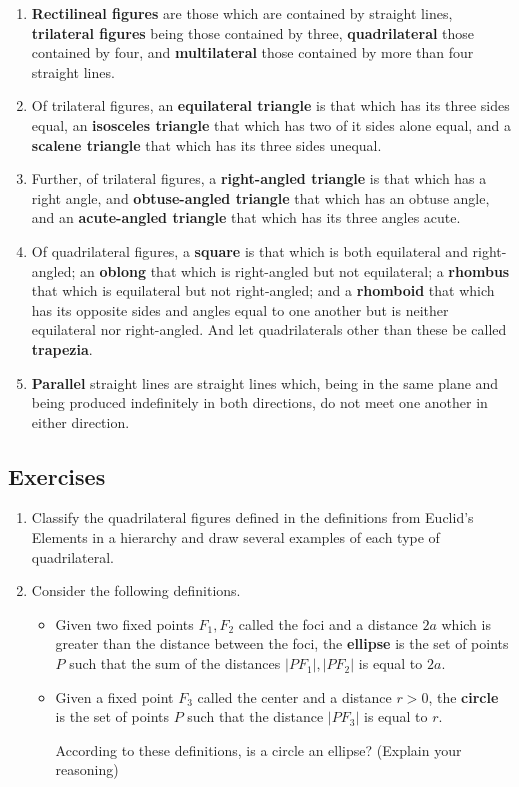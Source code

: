 \documentclass[
]{book}
\theoremstyle{definition}
\theoremstyle{definition}
\theoremstyle{definition}
\theoremstyle{definition}
\theoremstyle{remark}
\begin{document}
\begin{enumerate}
\item
  \textbf{Rectilineal figures} are those which are contained by straight lines, \textbf{trilateral figures} being those contained by three, \textbf{quadrilateral} those contained by four, and \textbf{multilateral} those contained by more than four straight lines.
\item
  Of trilateral figures, an \textbf{equilateral triangle} is that which has its three sides equal, an \textbf{isosceles triangle} that which has two of it sides alone equal, and a \textbf{scalene triangle} that which has its three sides unequal.
\item
  Further, of trilateral figures, a \textbf{right-angled triangle} is that which has a right angle, and \textbf{obtuse-angled triangle} that which has an obtuse angle, and an \textbf{acute-angled triangle} that which has its three angles acute.
\item
  Of quadrilateral figures, a \textbf{square} is that which is both equilateral and right-angled; an \textbf{oblong} that which is right-angled but not equilateral; a \textbf{rhombus} that which is equilateral but not right-angled; and a \textbf{rhomboid} that which has its opposite sides and angles equal to one another but is neither equilateral nor right-angled. And let quadrilaterals other than these be called \textbf{trapezia}.
\item
  \textbf{Parallel} straight lines are straight lines which, being in the same plane and being produced indefinitely in both directions, do not meet one another in either direction.
\end{enumerate}

\hypertarget{exercises-37}{%
\subsection{Exercises}\label{exercises-37}}

\begin{enumerate}
\def\labelenumi{\arabic{enumi}.}
\item
  Classify the quadrilateral figures defined in the definitions from Euclid's Elements in a hierarchy and draw several examples of each type of quadrilateral.
\item
  Consider the following definitions.

  \begin{itemize}
  \item
    Given two fixed points \(F_1, F_2\) called the foci and a distance \(2a\) which is greater than the distance between the foci, the \textbf{ellipse} is the set of points \(P\) such that the sum of the distances \(|PF_{1}|, |PF_{2}|\) is equal to \(2a\).
  \item
    Given a fixed point \(F_3\) called the center and a distance \(r>0\), the \textbf{circle} is the set of points \(P\) such that the distance \(|PF_3|\) is equal to \(r\).

    According to these definitions, is a circle an ellipse? (Explain your reasoning)
  \end{itemize}
\end{enumerate}
\end{document}
